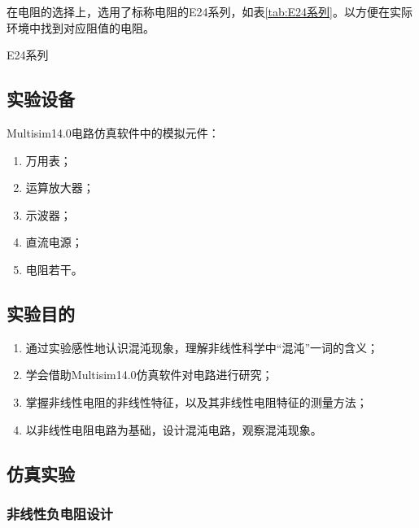 \documentclass{article}
\begin{document}
在电阻的选择上，选用了标称电阻的E24系列，如表\ref{tab:E24系列}。以方便在实际环境中找到对应阻值的电阻。

\begin{table}[htpb]
	\centering
	\caption{E24系列}
	\label{tab:E24系列}
\end{table}

\subsection{实验设备}%
\label{sub:实验设备}

Multisim14.0电路仿真软件中的模拟元件：

\begin{enumerate}
	\item 万用表；
	\item 运算放大器；
	\item 示波器；
	\item 直流电源；
	\item 电阻若干。
\end{enumerate}

\subsection{实验目的}%
\label{sub:实验目的}

\begin{enumerate}
	\item 通过实验感性地认识混沌现象，理解非线性科学中“混沌”一词的含义；
	\item 学会借助Multisim14.0仿真软件对电路进行研究；
	\item 掌握非线性电阻的非线性特征，以及其非线性电阻特征的测量方法；
	\item 以非线性电阻电路为基础，设计混沌电路，观察混沌现象。
\end{enumerate}

\subsection{仿真实验}%
\label{sub:仿真实验}

\subsubsection{非线性负电阻设计}%
\label{ssub:非线性负电阻设计}
\end{document}
